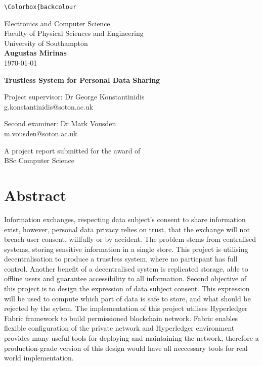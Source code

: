 \documentclass[12pt]{article}
\begin{document}
    \makeatletter
    \xpretocmd\lstinline{\Colorbox{backcolour}\bgroup\appto\lst@DeInit{\egroup}}{}{}
    \makeatother

    \begin{titlepage}
        \begin{center}
            \vspace{1cm}

            \LARGE
            Electronics and Computer Science\\
            Faculty of Physical Sciences and Engineering\\
            University of Southampton\\

            \Large
            \vspace{1.5cm}
            \textbf{Augustas Mirinas}\\
            \today

            \LARGE
            \vspace{1.5cm}
            \textbf{Trustless System for Personal Data Sharing}
            
            \vspace{1.5cm}
            \Large
            Project supervisor: Dr George Konstantinidis\\
            g.konstantinidis@soton.ac.uk
            
            \Large
            Second examiner: Dr Mark Vousden\\
            m.vousden@soton.ac.uk
            
            \vfill
            A project report submitted for the award of\\
            BSc Computer Science
            
        \end{center}
    \end{titlepage}

    \section*{Abstract}
    Information exchanges, respecting data subject's consent to share information exist, however, personal data privacy relies on trust, that the exchange will not breach user consent, willfully or by accident. The problem stems from centralised systems, storing sensitive information in a single store. This project is utilising decentralisation to produce a trustless system, where no particpant has full control. Another benefit of a decentralised system is replicated storage, able to offline users and guarantee accessibility to all information. Second objective of this project is to design the expression of data subject consent. This expression will be used to compute which part of data is safe to store, and what should be rejected by the sytem. The implementation of this project utilises Hyperledger Fabric framework to build permissioned blockchain network. Fabric enables flexible configuration of the private network and Hyperledger environment provides many useful tools for deploying and maintaining the network, therefore a production-grade version of this design would have all neccessary tools for real world implementation.
\end{document}
